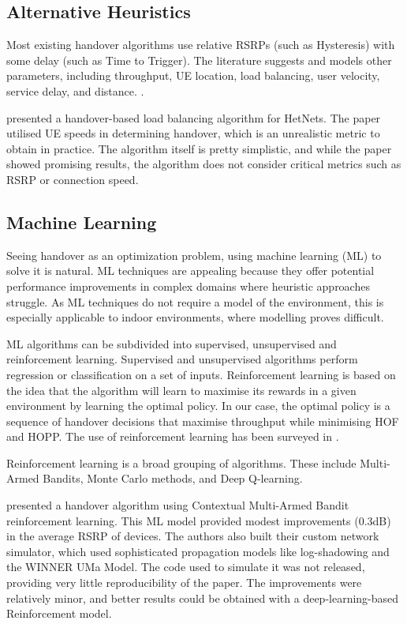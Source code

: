 \clearpage %

\subsection{Alternative Heuristics}
Most existing handover algorithms use relative RSRPs (such as Hysteresis) with some delay (such as Time to Trigger). The literature suggests and models other parameters, including throughput, UE location, load balancing, user velocity, service delay, and distance. \cite{nyangaresi_efficient_2022}.

\citet{hatipoglu_handover-based_2020} presented a handover-based load balancing algorithm for HetNets. The paper utilised UE speeds in determining handover, which is an unrealistic metric to obtain in practice. The algorithm itself is pretty simplistic, and while the paper showed promising results, the algorithm does not consider critical metrics such as RSRP or connection speed.

\subsection{Machine Learning}
Seeing handover as an optimization problem, using machine learning (ML) to solve it is natural. ML techniques are appealing because they offer potential performance improvements in complex domains where heuristic approaches struggle. As ML techniques do not require a model of the environment, this is especially applicable to indoor environments, where modelling proves difficult.

ML algorithms can be subdivided into supervised, unsupervised and reinforcement learning. Supervised and unsupervised algorithms perform regression or classification on a set of inputs. Reinforcement learning is based on the idea that the algorithm will learn to maximise its rewards in a given environment by learning the optimal policy. In our case, the optimal policy is a sequence of handover decisions that maximise throughput while minimising HOF and HOPP. The use of reinforcement learning has been surveyed in \cite{mollel_survey_2021}.

Reinforcement learning is a broad grouping of algorithms. These include Multi-Armed Bandits, Monte Carlo methods, and Deep Q-learning.

\citet{yajnanarayana_5g_2020} presented a handover algorithm using Contextual Multi-Armed Bandit reinforcement learning. This ML model provided modest improvements (0.3dB) in the average RSRP of devices. The authors also built their custom network simulator, which used sophisticated propagation models like log-shadowing and the WINNER UMa Model. The code used to simulate it was not released, providing very little reproducibility of the paper. The improvements were relatively minor, and better results could be obtained with a deep-learning-based Reinforcement model.

